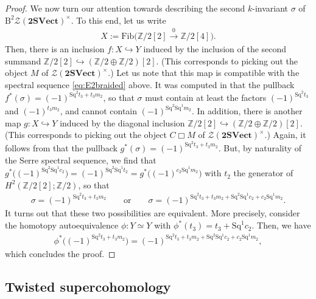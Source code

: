 \documentclass[pdftex]{sigma}
\numberwithin{equation}{section}
\begin{document}
\begin{proof}
We now turn our attention towards describing the second $k$-invariant $\sigma$ of $\mathrm{B}^2\mathscr{Z}(\mathbf{2SVect})^{\times}$. To this end, let us write
\begin{gather*}
X:=\mathrm{Fib}\big(\mathbb{Z}/2[2]\xrightarrow{0}\mathbb{Z}/2[4]\big).
\end{gather*}
 Then, there is an inclusion $f\colon X\hookrightarrow Y$ induced by the inclusion of the second summand $\mathbb{Z}/2[2]\hookrightarrow (\mathbb{Z}/2\oplus\mathbb{Z}/2)[2]$. (This corresponds to picking out the object $M$ of $\mathscr{Z}(\mathbf{2SVect})^{\times}$.) Let us note that this map is compatible with the spectral sequence \eqref{eq:E2braided} above. It was computed in \cite[Theorem~3.2]{JFR} that the pullback $f^*(\sigma) = (-1)^{\mathrm{Sq}^2t_3 + t_3m_2}$, so that $\sigma$ must contain at least the factors $(-1)^{\mathrm{Sq}^2t_3}$ and $(-1)^{t_3m_2}$, and cannot contain $(-1)^{\mathrm{Sq}^2\mathrm{Sq}^1m_2}$. In addition, there is another map $g\colon X\hookrightarrow Y$ induced by the diagonal inclusion $\mathbb{Z}/2[2]\hookrightarrow (\mathbb{Z}/2\oplus\mathbb{Z}/2)[2]$. (This corresponds to picking out the object $C\Box M$ of $\mathscr{Z}(\mathbf{2SVect})^{\times}$.) Again, it follows from \cite[Theorem~3.2]{JFR} that the pullback $g^*(\sigma) = (-1)^{\mathrm{Sq}^2t_3 + t_3m_2}$. But, by naturality of the Serre spectral sequence, we find that $g^*\big((-1)^{\mathrm{Sq}^2\mathrm{Sq}^1c_2}\big) = (-1)^{\mathrm{Sq}^2\mathrm{Sq}^1t_2} = g^*\big((-1)^{c_2\mathrm{Sq}^1m_2}\big)$ with $t_2$ the generator of $H^2(\mathbb{Z}/2[2];\mathbb{Z}/2)$, so that
 \begin{gather*}
 \sigma = (-1)^{\mathrm{Sq}^2t_3 + t_3m_2}\qquad \text{or}\qquad \sigma = (-1)^{\mathrm{Sq}^2t_3 + t_3m_2 + \mathrm{Sq}^2\mathrm{Sq}^1c_2 + c_2\mathrm{Sq}^1m_2}.
 \end{gather*}
 It turns out that these two possibilities are equivalent. More precisely, consider the homotopy autoequivalence $\phi\colon Y\simeq Y$ with $\phi^*(t_3) = t_3 + \mathrm{Sq}^1c_2$. Then, we have
 \begin{gather*}
 \phi^*\big((-1)^{\mathrm{Sq}^2t_3 + t_3m_2}\big) = (-1)^{\mathrm{Sq}^2t_3 + t_3m_2 + \mathrm{Sq}^2\mathrm{Sq}^1c_2 + c_2\mathrm{Sq}^1m_2},
 \end{gather*}
which concludes the proof.
\end{proof}

\subsection{Twisted supercohomology}
\end{document}
